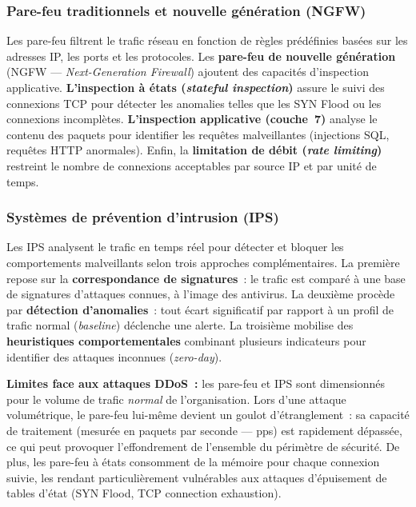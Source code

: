 \subsubsection{Pare-feu traditionnels et nouvelle génération (NGFW)}

Les pare-feu filtrent le trafic réseau en fonction de règles prédéfinies basées sur les adresses IP, les ports et les protocoles. Les \textbf{pare-feu de nouvelle génération} (NGFW --- \textit{Next-Generation Firewall}) ajoutent des capacités d'inspection applicative. \textbf{L'inspection à états (\textit{stateful inspection})} assure le suivi des connexions TCP pour détecter les anomalies telles que les SYN Flood ou les connexions incomplètes. \textbf{L'inspection applicative (couche~7)} analyse le contenu des paquets pour identifier les requêtes malveillantes (injections SQL, requêtes HTTP anormales). Enfin, la \textbf{limitation de débit (\textit{rate limiting})} restreint le nombre de connexions acceptables par source IP et par unité de temps.

\subsubsection{Systèmes de prévention d'intrusion (IPS)}

Les IPS analysent le trafic en temps réel pour détecter et bloquer les comportements malveillants selon trois approches complémentaires. La première repose sur la \textbf{correspondance de signatures}~: le trafic est comparé à une base de signatures d'attaques connues, à l'image des antivirus. La deuxième procède par \textbf{détection d'anomalies}~: tout écart significatif par rapport à un profil de trafic normal (\textit{baseline}) déclenche une alerte. La troisième mobilise des \textbf{heuristiques comportementales} combinant plusieurs indicateurs pour identifier des attaques inconnues (\textit{zero-day}).

\textbf{Limites face aux attaques DDoS~:} les pare-feu et IPS sont dimensionnés pour le volume de trafic \textit{normal} de l'organisation. Lors d'une attaque volumétrique, le pare-feu lui-même devient un goulot d'étranglement~: sa capacité de traitement (mesurée en paquets par seconde --- pps) est rapidement dépassée, ce qui peut provoquer l'effondrement de l'ensemble du périmètre de sécurité. De plus, les pare-feu à états consomment de la mémoire pour chaque connexion suivie, les rendant particulièrement vulnérables aux attaques d'épuisement de tables d'état (SYN Flood, TCP connection exhaustion).

